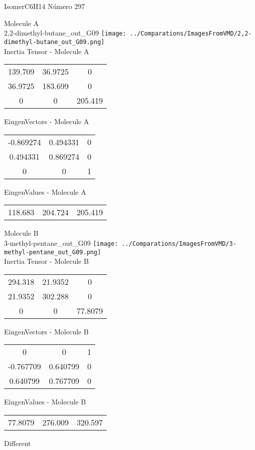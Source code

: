 \vtab[-2cm]
\begin{center}
{\large IsomerC6H14 \tab Número 297}
\end{center}
\begin{multicols}{2}
\begin{center}

Molecule A \\ 
2,2-dimethyl-butane\_out\_G09
\texttt{[image: ../Comparations/ImagesFromVMD/2,2-dimethyl-butane\_out\_G09.png]}
\\
Inertia Tensor - Molecule A \\
\vtab

\begin{tabular}{|c c c|}
139.709	 & 	36.9725	 & 	0	 \\
36.9725	 & 	183.699	 & 	0	 \\
0	 & 	0	 & 	205.419
\end{tabular}

\vtab
 EingenVectors - Molecule A     \\
\vtab
\begin{tabular}{|c c c|}
-0.869274	 & 	0.494331	 & 	0	 \\
0.494331	 & 	0.869274	 & 	0	 \\
0	 & 	0	 & 	1
\end{tabular}

\vtab
 EingenValues - Molecule A     \\
\vtab
\begin{tabular}{|c c c|}
118.683	 & 	204.724	 & 	205.419	 \\
\end{tabular}
\columnbreak

Molecule B \\ 
3-methyl-pentane\_out\_G09
\texttt{[image: ../Comparations/ImagesFromVMD/3-methyl-pentane\_out\_G09.png]}
\\
Inertia Tensor - Molecule B \\
\vtab

\begin{tabular}{|c c c|}
294.318	 & 	21.9352	 & 	0	 \\
21.9352	 & 	302.288	 & 	0	 \\
0	 & 	0	 & 	77.8079
\end{tabular}

\vtab
 EingenVectors - Molecule B     \\
\vtab
\begin{tabular}{|c c c|}
0	 & 	0	 & 	1	 \\
-0.767709	 & 	0.640799	 & 	0	 \\
0.640799	 & 	0.767709	 & 	0
\end{tabular}

\vtab
 EingenValues - Molecule B     \\
\vtab
\begin{tabular}{|c c c|}
77.8079	 & 	276.009	 & 	320.597	 \\
\end{tabular}

\end{center}
\end{multicols}
\begin{center}
\vtab
\vtab
\textcolor{NavyBlue}{\Large Different}
\end{center}

